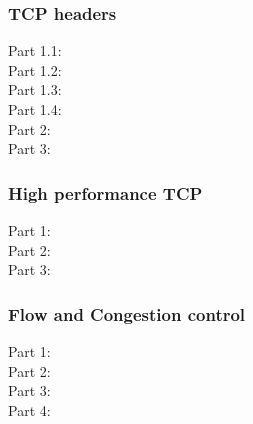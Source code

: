 \subsubsection{TCP headers}
\begin{description}
    \item[Part 1.1:] 
    \item[Part 1.2:] 
    \item[Part 1.3:] 
    \item[Part 1.4:] 
    \item[Part 2:] 
    \item[Part 3:] 
\end{description}

\subsubsection{High performance TCP}
\begin{description}
    \item[Part 1:] %
    \item[Part 2:] %
    \item[Part 3:] 
\end{description}

\subsubsection{Flow and Congestion control}
\begin{description}
    \item[Part 1:] 
    \item[Part 2:] 
    \item[Part 3:] %
    \item[Part 4:] 
\end{description}
